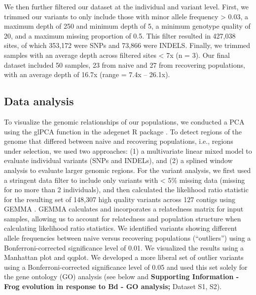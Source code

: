 \documentclass[9pt,twocolumn,twoside,lineno]{pnas-new}
\begin{document}
{We then further filtered our dataset at the individual and variant
level. First, we trimmed our variants to only include those with minor
allele frequency \textgreater{} 0.03, a maximum depth of 250 and minimum
depth of 5, a minimum genotype quality of 20, and a maximum missing
proportion of 0.5. This filter resulted in 427,038 sites, of which
353,172 were SNPs and 73,866 were INDELS. Finally, we trimmed samples
with an average depth across filtered sites \textless{} 7x (n = 3). Our
final dataset included 50 samples, 23 from naive and 27 from recovering
populations, with an average depth of 16.7x (range = 7.4x -- 26.1x).

\hypertarget{data-analysis}{%
\subsection*{Data analysis}\label{data-analysis}}

To visualize the genomic relationships of our populations, we conducted
a PCA using the glPCA function in the adegenet R package
\citep{jombart2008}. To detect regions of the genome that differed
between naive and recovering populations, i.e., regions under selection,
we used two approaches: (1) a multivariate linear mixed model to
evaluate individual variants (SNPs and INDELs), and (2) a splined window
analysis to evaluate larger genomic regions. For the variant analysis,
we first used a stringent data filter to include only variants with
\textless{} 5\% missing data (missing for no more than 2 individuals),
and then calculated the likelihood ratio statistic for the resulting set
of 148,307 high quality variants across 127 contigs using GEMMA
\citep{zhou2014}. GEMMA calculates and incorporates a relatedness matrix
for input samples, allowing us to account for relatedness and population
structure when calculating likelihood ratio statistics. We identified
variants showing different allele frequencies between naive versus
recovering populations (``outliers'') using a Bonferroni-corrected
significance level of 0.01. We visualized the results using a Manhattan
plot and qqplot. We developed a more liberal set of outlier variants
using a Bonferroni-corrected significance level of 0.05 and used this
set solely for the gene ontology (GO) analysis (see below and
\textbf{Supporting Information - Frog evolution in response to Bd - GO
analysis;}  Dataset S1, S2).

}
\end{document}
